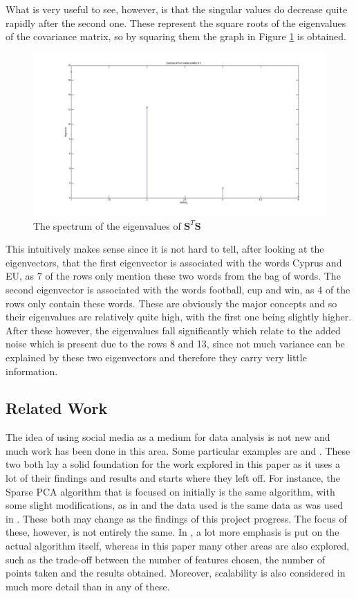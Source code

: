 \documentclass[11pt,a4paper]{article}
\begin{document}
What is very useful to see, however, is that the singular values do decrease quite rapidly after the second one. These represent the square roots of the eigenvalues of the covariance matrix, so by squaring them the graph in Figure \ref{spectrum} is obtained.

\begin{figure}[H]
\centering
\includegraphics[scale=0.3]{Spectrum_Eigenvalues.jpg}
\caption{The spectrum of the eigenvalues of $\mathbf{S}^T\mathbf{S}$}
\label{spectrum}
\end{figure}

This intuitively makes sense since it is not hard to tell, after looking at the eigenvectors, that the first eigenvector is associated with the words Cyprus and EU, as 7 of the rows only mention these two words from the bag of words. The second eigenvector is associated with the words football, cup and win, as 4 of the rows only contain these words. These are obviously the major concepts and so their eigenvalues are relatively quite high, with the first one being slightly higher. After these however, the eigenvalues fall significantly which relate to the added noise which is present due to the rows 8 and 13, since not much variance can be explained by these two eigenvectors and therefore they carry very little information. 

\subsection{Related Work}
The idea of using social media as a medium for data analysis is not new and much work has been done in this area. Some particular examples are \cite{dimakis} and \cite{microblogs}. These two both lay a solid foundation for the work explored in this paper as it uses a lot of their findings and results and starts where they left off. For instance, the Sparse PCA algorithm that is focused on initially is the same algorithm, with some slight modifications, as in \cite{dimakis} and the data used is the same data as was used in \cite{microblogs}. These both may change as the findings of this project progress. The focus of these, however, is not entirely the same. In \cite{dimakis}, a lot more emphasis is put on the actual algorithm itself, whereas in this paper many other areas are also explored, such as the trade-off between the number of features chosen, the number of points taken and the results obtained. Moreover, scalability is also considered in much more detail than in any of these. 
\end{document}
